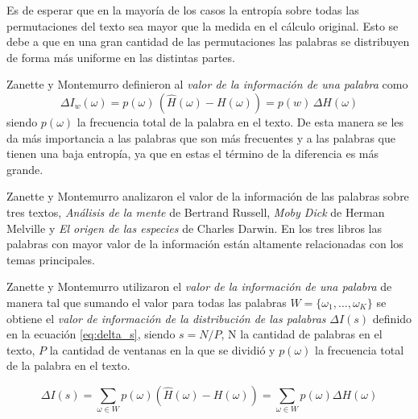 
Es de esperar que en la mayoría de los casos 
la entropía sobre todas las permutaciones del texto sea mayor que la medida en el cálculo original. Esto 
se debe a que en una gran cantidad de las permutaciones las palabras se distribuyen de forma más uniforme 
en las distintas partes.

Zanette y Montemurro definieron al \textit{valor de la información de una palabra} como
 \begin{equation}
  \Delta I_w(\omega) = p(\omega) \,  (\widehat{H}(\omega) - H(\omega))  =  p(w) \, \Delta{H(\omega)}
 \end{equation}
siendo $p(\omega)$ la frecuencia total de la palabra en el texto.
De esta manera se les da más importancia a las palabras que son más frecuentes y a las palabras que tienen una baja entropía, ya que en estas el término de la diferencia es más grande.

Zanette y Montemurro analizaron el valor de la información de las palabras sobre tres textos, \textit{Análisis de la mente} de Bertrand Russell, 
\textit{Moby Dick} de Herman Melville y \textit{El origen de las especies} de Charles Darwin. 
En los tres libros las palabras con mayor valor de la información están 
altamente relacionadas con los temas principales. 


Zanette y Montemurro utilizaron el \textit{valor de la información de una palabra} de manera tal que sumando el valor para todas las palabras $W = \{\omega_1,\dots,\omega_K\}$ se obtiene el \textit{valor de información de la distribución de las palabras} $\Delta I(s)$ definido en la ecuación \ref{eq:delta_s}, siendo  $s = N/P$, N la cantidad de palabras en el texto, $P$ la cantidad de ventanas en la que se dividió y $p(\omega)$ la frecuencia total de la palabra en el texto.

\begin{equation}
  \Delta I(s) = \sum\limits_{\omega \in W } p(\omega) (\widehat{H}(\omega) - H(\omega)) = \sum\limits_{\omega \in W } p(\omega) \Delta H(\omega) 
  \label{eq:delta_s}
\end{equation}

